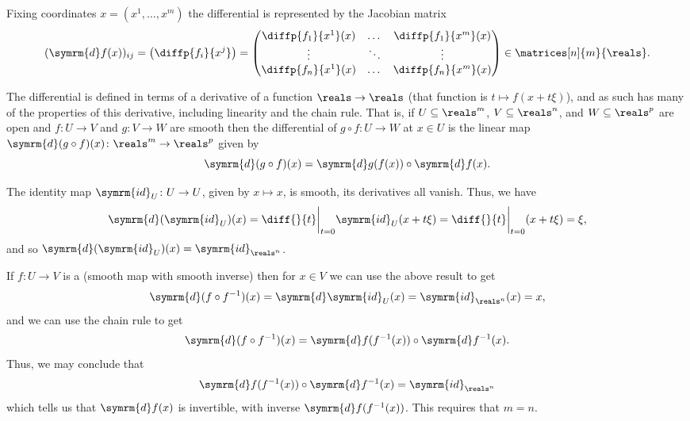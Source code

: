 \documentclass[fleqn]{NotesClass}
\renewcommand{\dl}{\symrm{d}}
\newcommand{\id}{\symrm{id}}
\begin{document}
    Fixing coordinates \(x = (x^1, \dotsc, x^m)\) the differential is represented by the Jacobian matrix
    \begin{equation}
        (\dl f(x))_{ij} = \left( \diffp{f_i}{x^j} \right) = 
        \begin{pmatrix}
            \diffp{f_1}{x^1}(x) & \dots & \diffp{f_1}{x^m}(x)\\
            \vdots & \ddots & \vdots\\
            \diffp{f_n}{x^1}(x) & \dots & \diffp{f_n}{x^m}(x)
        \end{pmatrix}
        \in \matrices[n]{m}{\reals}.
    \end{equation}
    
    The differential is defined in terms of a derivative of a function \(\reals \to \reals\) (that function is \(t \mapsto f(x + t\xi)\)), and as such has many of the properties of this derivative, including linearity and the chain rule.
    That is, if \(U \subseteq \reals^m\), \(V \subseteq \reals^n\), and \(W \subseteq \reals^p\) are open and \(f \colon U \to V\) and \(g \colon V \to W\) are smooth then the differential of \(g \circ f \colon U \to W\) at \(x \in U\) is the linear map \(\dl (g \circ f)(x) \colon \reals^m \to \reals^p\) given by
    \begin{equation}
        \dl (g \circ f)(x) = \dl g(f(x)) \circ \dl f(x).
    \end{equation}
    
    The identity map \(\id_U \colon U \to U\), given by \(x \mapsto x\), is smooth, its derivatives all vanish.
    Thus, we have
    \begin{equation}
        \dl (\id_U) (x) = \diff{}{t} \bigg|_{t = 0} \id_U(x + t\xi) = \diff{}{t} \bigg|_{t = 0} (x + t\xi) = \xi,
    \end{equation}
    and so \(\dl (\id_U)(x) = \id_{\reals^n}\).
    
    If \(f \colon U \to V\) is a  (smooth map with smooth inverse) then for \(x \in V\) we can use the above result to get
    \begin{align}
        \dl (f \circ f^{-1})(x) = \dl \id_U(x) = \id_{\reals^n}(x) = x,
    \end{align}
    and we can use the chain rule to get
    \begin{equation}
        \dl (f \circ f^{-1})(x) = \dl f(f^{-1}(x)) \circ \dl f^{-1}(x).
    \end{equation}
    Thus, we may conclude that
    \begin{equation}
        \dl f(f^{-1}(x)) \circ \dl f^{-1}(x) = \id_{\reals^n}
    \end{equation}
    which tells us that \(\dl f(x)\) is invertible, with inverse \(\dl f(f^{-1}(x))\).
    This requires that \(m = n\).
    
\end{document}
